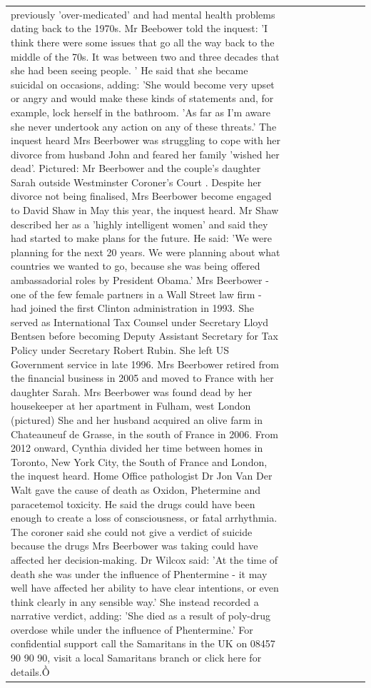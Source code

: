 \begin{table}[H]
\begin{tabular}{lllrlllll}
previously 'over-medicated' and had mental health problems dating back to the 1970s. Mr Beebower told the inquest: 'I think there were some issues that go all the way back to the middle of the 70s. It was between two and three decades that she had been seeing people. ' He said that she became suicidal on occasions, adding: 'She would become very upset or angry and would make these kinds of statements and, for example, lock herself in the bathroom. 'As far as I'm aware she never undertook any action on any of these threats.' The inquest heard Mrs Beerbower was struggling to cope with her divorce from husband John and feared her family 'wished her dead'. Pictured: Mr Beerbower and the couple's daughter Sarah outside Westminster Coroner's Court . Despite her divorce not being finalised, Mrs Beerbower become engaged to David Shaw in May this year, the inquest heard. Mr Shaw described her as a 'highly intelligent women' and said they had started to make plans for the future. He said: 'We were planning for the next 20 years. We were planning about what countries we wanted to go, because she was being offered ambassadorial roles by President Obama.' Mrs Beerbower - one of the few female partners in a Wall Street law firm - had joined the first Clinton administration in 1993. She served as International Tax Counsel under Secretary Lloyd Bentsen before becoming Deputy Assistant Secretary for Tax Policy under Secretary Robert Rubin. She left US Government service in late 1996. Mrs Beerbower retired from the financial business in 2005 and moved to France with her daughter Sarah. Mrs Beerbower was found dead by her housekeeper at her apartment in Fulham, west London (pictured) She and her husband acquired an olive farm in Chateauneuf de Grasse, in the south of France in 2006. From 2012 onward, Cynthia divided her time between homes in Toronto, New York City, the South of France and London, the inquest heard. Home Office pathologist Dr Jon Van Der Walt gave the cause of death as Oxidon, Phetermine and paracetemol toxicity. He said the drugs could have been enough to create a loss of consciousness, or fatal arrhythmia. The coroner said she could not give a verdict of suicide because the drugs Mrs Beerbower was taking could have affected her decision-making. Dr Wilcox said: 'At the time of death she was under the influence of Phentermine - it may well have affected her ability to have clear intentions, or even think clearly in any sensible way.' She instead recorded a narrative verdict, adding: 'She died as a result of poly-drug overdose while under the influence of Phentermine.' For confidential support call the Samaritans in the UK on 08457 90 90 90, visit a local Samaritans branch or click here for details.Ồ \\

\end{tabular}
\end{table}

